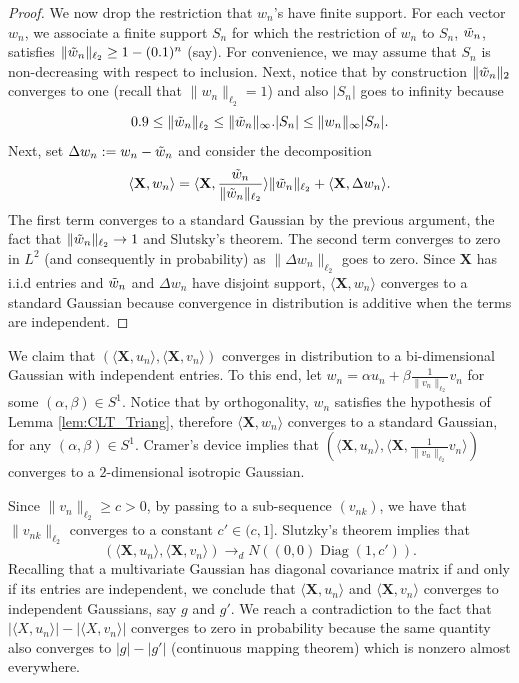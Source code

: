 \documentclass[a4paper,12pt]{amsart}
\numberwithin{equation}{section}
\newcommand{\X}{\mathbf X}
\newcommand{\diag}{\operatorname{Diag}}
\begin{document}
\begin{proof}
We now drop the restriction that $w_n$'s have finite support. For each vector $w_n$, we associate a finite support $S_n$ for which the restriction of $w_n$ to $S_n$, $\Tilde{w}_n$, satisfies $\|\Tilde{w}_n\|_{\ell_2} \ge 1- (0.1)^n$ (say). For convenience, we may assume that $S_{n}$ is non-decreasing with respect to inclusion. Next, notice that by construction $\|\Tilde{w}_n\|_2$ converges to one (recall that $\|w_n\|_{\ell_2}=1$) and also $|S_n|$ goes to infinity because 
\begin{equation*}
    0.9 \le \|\Tilde{w}_n\|_{\ell_2} \le \|\Tilde{w}_n\|_{\infty}. |S_n| \le \|w_n\|_{\infty}|S_n|.
\end{equation*}
Next, set $\Delta w_n := w_n -\Tilde{w}_n$ and consider the decomposition
\begin{equation*}
    \langle \X, w_n\rangle = \langle \X, \frac{\Tilde{w}_n}{\|\Tilde{w}_n\|_{\ell_2}}\rangle\|\Tilde{w}_n\|_{\ell_2} + \langle \X,\Delta w_n\rangle.
\end{equation*}
The first term converges to a standard Gaussian by the previous argument, the fact that $\|\Tilde{w}_n\|_{\ell_2}\rightarrow 1$ and Slutsky's theorem. The second term converges to zero in $L^2$ (and consequently in probability) as $\|\Delta w_n\|_{\ell_2}$ goes to zero. Since $\X$ has i.i.d entries and $\Tilde{w}_n$ and $\Delta w_n$ have disjoint support,  $\langle \X, w_n\rangle$ converges to a standard Gaussian because convergence in distribution is additive when the terms are independent.
\end{proof}

We claim that $(\langle \X,u_n\rangle, \langle \X,v_n\rangle)$ converges in distribution to a bi-dimensional Gaussian with independent entries. To this end, let $w_n = \alpha u_n + \beta \frac{1}{\|v_n\|_{\ell_2}}v_n$ for some $(\alpha, \beta) \in S^1$. Notice that by orthogonality, $w_n$ satisfies the hypothesis of Lemma \ref{lem:CLT_Triang}, therefore $\langle \X,w_n\rangle$ converges to a standard Gaussian, for any $(\alpha,\beta)\in S^1$. Cramer's device implies that $(\langle \X,u_n\rangle,\langle \X,\frac{1}{\|v_n\|_{\ell_2}}v_n\rangle)$ converges to a $2$-dimensional isotropic Gaussian.

Since $\|v_n\|_{\ell_2}\ge c>0$, by passing to a sub-sequence $(v_{nk})$, we have that $\|v_{nk}\|_{\ell_2}$ converges to a constant $c'\in (c,1]$. Slutzky's theorem implies that 
\begin{equation*}
    (\langle \X, u_n\rangle, \langle \X, v_n\rangle) \rightarrow_{d} N\left((0,0)\diag(1,c')\right).
\end{equation*}
Recalling that a multivariate Gaussian has diagonal covariance matrix if and only if its entries are independent, we conclude that $\langle \X, u_n\rangle$ and $\langle \X, v_n\rangle$ converges to independent Gaussians, say $g$ and $g'$. We reach a contradiction to the fact that $|\langle X,u_n\rangle| - |\langle X,v_n\rangle|$ converges to zero in probability because the same quantity also converges to $|g|-|g'|$ (continuous mapping theorem) which is nonzero almost everywhere.
\end{document}
